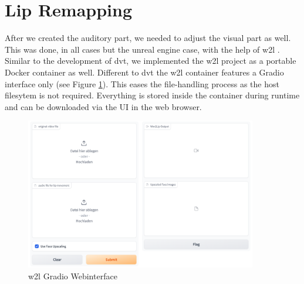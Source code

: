\documentclass[
  a4paper,  %
  twoside,  %
  bibliography=totoc,
  headsepline,
  cleardoublepage=empty,
  parskip=half,
  draft=false
]{scrbook}
\begin{document}
\section{Lip Remapping}
 After we created the auditory part, we needed to adjust the visual part as well. This was done, in all cases but the unreal engine case, with the help of \gls{w2l} \cite{mukhopadhyayWav2LipAccuratelyLipsyncing2023}. Similar to the development of \gls{dvt}, we implemented the \gls{w2l} project as a portable Docker container as well. Different to \gls{dvt} the \gls{w2l} container features a Gradio interface only (see Figure \ref{fig:w2l-gradio}). This eases the file-handling process as the host filesytem is not required. Everything is stored inside the container during runtime and can be downloaded via the UI in the web browser.
 \begin{figure}[h]
  \centering
  \includegraphics[width=0.9\textwidth]{./graphics/images/wav2lip/w2l-gradio.png}
  \caption{\gls{w2l} Gradio Webinterface}
  \label{fig:w2l-gradio}
\end{figure}
\end{document}
